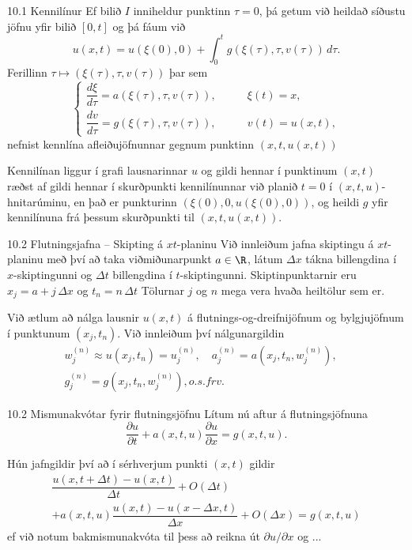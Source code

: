 \begin{frame}{10.1 Kennilínur} 
Ef bilið $I$ inniheldur punktinn $\tau=0$, þá getum við heildað
síðustu jöfnu yfir bilið $[0,t]$ og þá fáum við 
$$
u(x,t)=u(\xi(0),0)+\int_0^tg(\xi(\tau),\tau,v(\tau))\, d\tau.
$$
Ferillinn $\tau\mapsto (\xi(\tau),\tau,v(\tau))$ þar sem 
$$
\begin{cases}
  \dfrac{d\xi}{d\tau}=a(\xi(\tau),\tau,v(\tau)),&\qquad \xi(t)=x,\\
\dfrac{dv}{d\tau}=g(\xi(\tau),\tau,v(\tau)),& \qquad v(t)=u(x,t),
\end{cases}
$$
nefnist kennlína afleiðujöfnunnar gegnum punktinn $(x,t,u(x,t))$ 

\smallskip
Kennilínan liggur í grafi lausnarinnar $u$ og gildi hennar í punktinum 
$(x,t)$ ræðst af gildi hennar í skurðpunkti kennilínunnar við planið
$t=0$ í $(x,t,u)$-hnitarúminu, en það er punkturinn
$(\xi(0),0,u(\xi(0),0))$, og heildi $g$ yfir kennilínuna
frá þessum skurðpunkti til $(x,t,u(x,t))$.
\end{frame}


\begin{frame}{10.2 Flutningsjafna -- Skipting á $xt$-planinu} 
Við innleiðum jafna skiptingu á $xt$-planinu með því að taka
viðmiðunarpunkt  $a\in \R$, látum $\Delta x$ tákna billengdina í
$x$-skiptingunni og $\Delta t$ billengdina í  $t$-skiptingunni.
Skiptinpunktarnir eru $x_j=a+j\, \Delta x$ og $t_n=n\, \Delta t$
Tölurnar $j$ og $n$ mega vera hvaða heiltölur sem er.

\smallskip
Við ætlum að nálga lausnir $u(x,t)$ á flutnings-og-dreifnijöfnum 
og bylgjujöfnum í punktunum $(x_j,t_n)$.   Við innleiðum því 
nálgunargildin
\begin{multline*}
w_j^{(n)}\approx u(x_j,t_n)=u_j^{(n)}, \quad
a_j^{(n)}=a(x_j,t_n,w_j^{(n)}), \quad \\
g_j^{(n)}=g(x_j,t_n,w_j^{(n)}), o.s.frv. 
\end{multline*}
\end{frame}


\begin{frame}{10.2 Mismunakvótar fyrir flutningsjöfnu} 
Lítum nú aftur á flutningsjöfnuna
$$
\dfrac{\partial u}{\partial t}
+a(x,t,u)\dfrac{\partial u}{\partial x}=g(x,t,u).
$$

\smallskip
Hún jafngildir því að í sérhverjum punkti $(x,t)$ gildir
\begin{multline*}
\dfrac{u(x,t+\Delta t)-u(x,t)}{\Delta t} +O(\Delta  t)\\
+a(x,t,u)\dfrac{u(x,t)-u(x-\Delta x,t)}{\Delta x}+O(\Delta x)
=g(x,t,u) 
\end{multline*}
ef við notum bakmismunakvóta til þess að reikna út $\partial
u/\partial x$ og ...
\end{frame}


